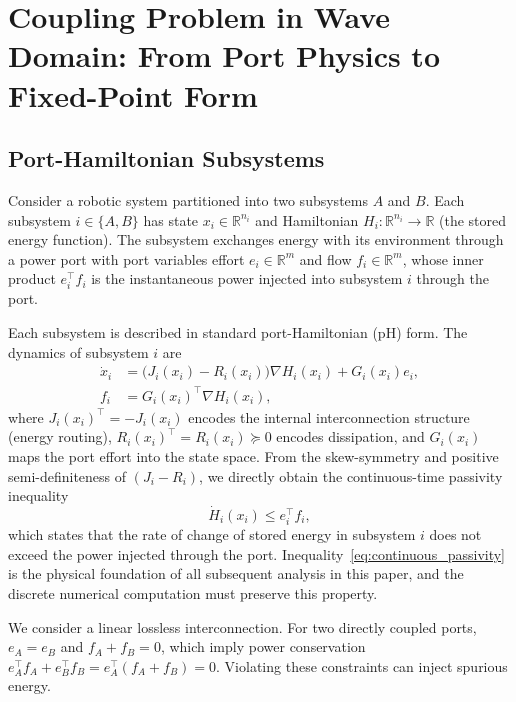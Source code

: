 \section{Coupling Problem in Wave Domain: From Port Physics to Fixed-Point Form}
\label{sec:problem_formulation}

\subsection{Port-Hamiltonian Subsystems}
\label{subsec:ph_passivity}

Consider a robotic system partitioned into two subsystems $A$ and $B$. Each subsystem $i \in \{A, B\}$ has state $x_i \in \mathbb{R}^{n_i}$ and Hamiltonian $H_i: \mathbb{R}^{n_i} \to \mathbb{R}$ (the stored energy function). The subsystem exchanges energy with its environment through a power port with port variables effort $e_i \in \mathbb{R}^m$ and flow $f_i \in \mathbb{R}^m$, whose inner product $e_i^\top f_i$ is the instantaneous power injected into subsystem $i$ through the port.

Each subsystem is described in standard port-Hamiltonian (pH) form. The dynamics of subsystem $i$ are
\begin{equation}
\begin{aligned}
\dot{x}_i &= \big(J_i(x_i) - R_i(x_i)\big) \nabla H_i(x_i) + G_i(x_i) e_i, \\[2pt]
f_i &= G_i(x_i)^\top \nabla H_i(x_i),
\end{aligned}
\label{eq:ph_subsystem}
\end{equation}
where $J_i(x_i)^\top = -J_i(x_i)$ encodes the internal interconnection structure (energy routing), $R_i(x_i)^\top = R_i(x_i) \succeq 0$ encodes dissipation, and $G_i(x_i)$ maps the port effort into the state space. From the skew-symmetry and positive semi-definiteness of $(J_i - R_i)$, we directly obtain the continuous-time passivity inequality
\begin{equation}
\dot{H}_i(x_i) \leq e_i^\top f_i,
\label{eq:continuous_passivity}
\end{equation}
which states that the rate of change of stored energy in subsystem $i$ does not exceed the power injected through the port. Inequality~\eqref{eq:continuous_passivity} is the physical foundation of all subsequent analysis in this paper, and the discrete numerical computation must preserve this property.

We consider a linear lossless interconnection. For two directly coupled ports, $e_A = e_B$ and $f_A + f_B = 0$, which imply power conservation $e_A^\top f_A + e_B^\top f_B = e_A^\top(f_A + f_B) = 0$. Violating these constraints can inject spurious energy.

